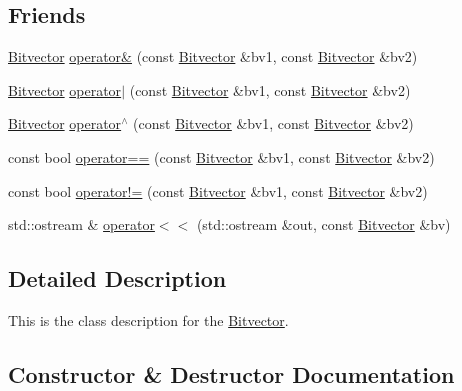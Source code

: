 \subsection*{Friends}
\begin{DoxyCompactItemize}
\item 
\hyperlink{classprism_1_1_bitvector}{Bitvector} \hyperlink{classprism_1_1_bitvector_aacc3670e298003822cf25f68fce7cbe0}{operator\&} (const \hyperlink{classprism_1_1_bitvector}{Bitvector} \&bv1, const \hyperlink{classprism_1_1_bitvector}{Bitvector} \&bv2)
\item 
\hyperlink{classprism_1_1_bitvector}{Bitvector} \hyperlink{classprism_1_1_bitvector_a7da9252d437ed366b78e5f728f20ab8d}{operator$\vert$} (const \hyperlink{classprism_1_1_bitvector}{Bitvector} \&bv1, const \hyperlink{classprism_1_1_bitvector}{Bitvector} \&bv2)
\item 
\hyperlink{classprism_1_1_bitvector}{Bitvector} \hyperlink{classprism_1_1_bitvector_a774fe42b1254399adc7b8c6646f7cab3}{operator$^\wedge$} (const \hyperlink{classprism_1_1_bitvector}{Bitvector} \&bv1, const \hyperlink{classprism_1_1_bitvector}{Bitvector} \&bv2)
\item 
const bool \hyperlink{classprism_1_1_bitvector_ab73504943fa9f2b6d0bbaef200ba4088}{operator==} (const \hyperlink{classprism_1_1_bitvector}{Bitvector} \&bv1, const \hyperlink{classprism_1_1_bitvector}{Bitvector} \&bv2)
\item 
const bool \hyperlink{classprism_1_1_bitvector_a085f70a7612a9fc1dd410533d09fa6fc}{operator!=} (const \hyperlink{classprism_1_1_bitvector}{Bitvector} \&bv1, const \hyperlink{classprism_1_1_bitvector}{Bitvector} \&bv2)
\item 
std\+::ostream \& \hyperlink{classprism_1_1_bitvector_a5082ad1e850f0d821b1310ab1ff1dc60}{operator$<$$<$} (std\+::ostream \&out, const \hyperlink{classprism_1_1_bitvector}{Bitvector} \&bv)
\end{DoxyCompactItemize}


\subsection{Detailed Description}
This is the class description for the \hyperlink{classprism_1_1_bitvector}{Bitvector}. 

\subsection{Constructor \& Destructor Documentation}
